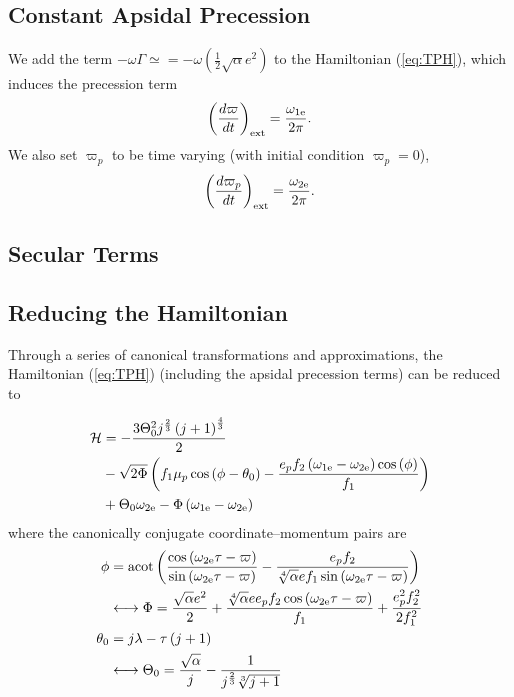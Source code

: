 \documentclass[usenatbib,twocolumn]{mnras}
\begin{document}
\subsection{Constant Apsidal Precession}
\label{sec:}
We add the term $-\omega\Gamma\simeq = -\omega\left(\frac12\sqrt{\alpha}e^2\right)$ to the Hamiltonian (\ref{eq:TPH}), which induces the precession term
\begin{equation}
    \left(\frac{d\varpi}{dt}\right)_{\rm ext} = \frac{\omega_{1\rm e}}{2\pi}.
\end{equation}
We also set $\varpi_p$ to be time varying (with initial condition $\varpi_p=0$),
\begin{equation}
    \left(\frac{d\varpi_p}{dt}\right)_{\rm ext} = \frac{\omega_{2\rm e}}{2\pi}.
\end{equation}

\subsection{Secular Terms}

\subsection{Reducing the Hamiltonian}
Through a series of canonical transformations and approximations, the Hamiltonian (\ref{eq:TPH}) (including the apsidal precession terms) can be reduced to 

\begin{align}
    \mathcal H
    &=- \frac{3 \Theta_{0}^{2} j^{\frac{2}{3}} \left(j + 1\right)^{\frac{4}{3}}}{2}\nonumber\\
    &-\sqrt{2\Phi} \left(f_{1} \mu_{p} \cos{\left(\phi - \theta_{0} \right)}-\frac{ e_{p} f_{2} \left(\omega_{1\rm e} - \omega_{2\rm e}\right) \cos{\left(\phi \right)}}{f_{1}}\right) \nonumber\\
    &+\Theta_{0} \omega_{2\rm e}- \Phi \left(\omega_{1\rm e} - \omega_{2\rm e}\right) 
\end{align}
where the canonically conjugate coordinate--momentum pairs are
\begin{align}
    \phi &= \operatorname{acot}{\left(\frac{\cos{\left(\omega_{2\rm e} \tau - \varpi \right)}}{\sin{\left(\omega_{2\rm e} \tau - \varpi \right)}} - \frac{e_{p} f_{2}}{\sqrt[4]{\alpha} e f_{1} \sin{\left(\omega_{2\rm e} \tau - \varpi \right)}} \right)}\\
    &\longleftrightarrow\Phi = \frac{\sqrt{\alpha} e^{2}}{2} + \frac{\sqrt[4]{\alpha} e e_{p} f_{2} \cos{\left(\omega_{2\rm e} \tau - \varpi \right)}}{f_{1}}  + \frac{e_{p}^{2} f_{2}^{2}}{2 f_{1}^{2}}\\
    \theta_{0} &= j \lambda - \tau \left(j + 1\right)\\
    &\longleftrightarrow\Theta_{0} = \frac{\sqrt{\alpha}}{j} - \frac{1}{j^{\frac{2}{3}} \sqrt[3]{j + 1}}
\end{align}
\end{document}
